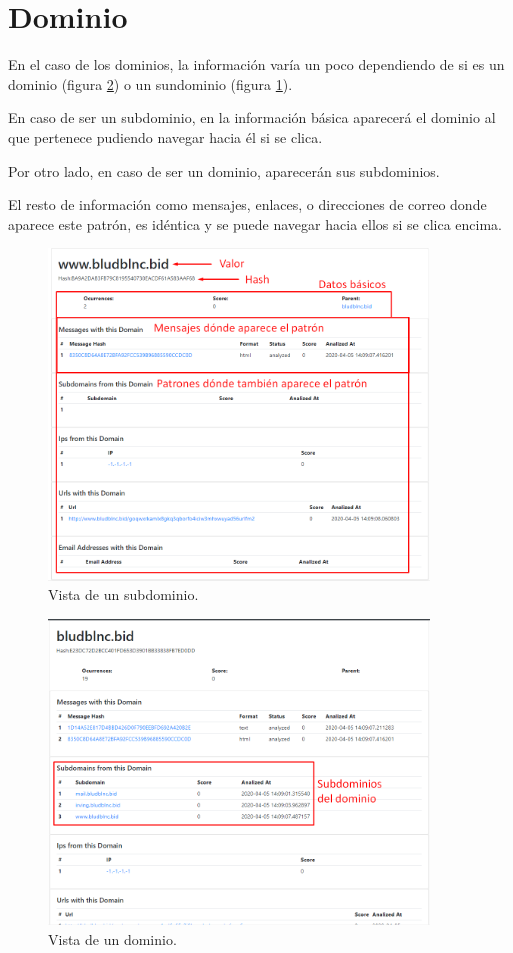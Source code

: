 \clearpage
\section{Dominio}
En el caso de los dominios, la información varía un poco dependiendo de si es un dominio (figura \ref{fig:dominio}) o un sundominio (figura \ref{fig:Subdominio}).

En caso de ser un subdominio, en la información básica aparecerá el dominio al que pertenece pudiendo navegar hacia él si se clica. 

Por otro lado, en caso de ser un dominio, aparecerán sus subdominios.

El resto de información como mensajes, enlaces, o direcciones de correo donde aparece este patrón, es idéntica y se puede navegar hacia ellos si se clica encima. 

\begin{figure}[htb]
    \centering
    \includegraphics[width=0.9\textwidth]{imagenes/capturasAplicacion/Subdominio.png}
\caption{Vista de un subdominio.}
\label{fig:Subdominio}
\end{figure}


\begin{figure}[htb]
    \centering
    \includegraphics[width=0.9\textwidth]{imagenes/capturasAplicacion/Dominio.png}
\caption{Vista de un dominio.}
\label{fig:dominio}
\end{figure}

